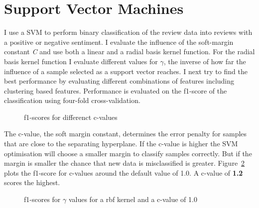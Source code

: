 \documentclass[11pt]{article}
\begin{document}
\section{Support Vector Machines}

I use a SVM to perform binary classification of the review data into reviews with a positive or negative sentiment. I evaluate the influence of the soft-margin constant \emph{C} and use both a linear and a radial basis kernel function. For the radial basis kernel function I evaluate different values for \emph{$\gamma$}, the inverse of how far the influence of a sample selected as a support vector reaches. I next try to find the best performance by evaluating different combinations of features including clustering based features. Performance is evaluated on the f1-score of the classification using four-fold cross-validation.

\begin{figure}
  \caption{f1-scores for differenct c-values}
  \label{fig:c-val}
\end{figure}

The c-value, the soft margin constant, determines the error penalty for samples that are close to the separating hyperplane. If the c-value is higher the SVM optimisation will choose a smaller margin to classify samples correctly. But if the margin is smaller the chance that new data is misclassified is greater. Figure~\ref{fig:c-val} plots the f1-score for c-values around the default value of 1.0. A c-value of \textbf{1.2} scores the highest.

\begin{figure}
  \caption{f1-scores for $\gamma$ values for a rbf kernel and a c-value of 1.0}
  \label{fig:c-val}
\end{figure}
\end{document}

